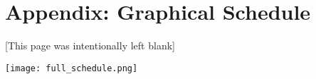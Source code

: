 \section{Appendix: Graphical Schedule}
\label{appendix:schedule}
[This page was intentionally left blank]

\newpage
\begin{landscape}
	\centering
	{\texttt{[image: full\_schedule.png]}}
\end{landscape}
